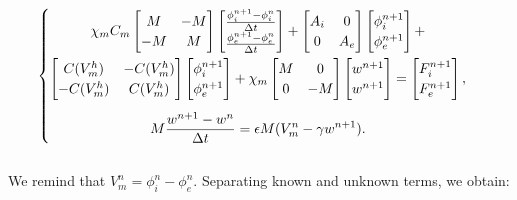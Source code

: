 \documentclass[a4paper,11pt]{article}
\begin{document}
\begin{equation*}
\begin{cases}
 \begin{gathered}
 \chi_mC_m \begin{bmatrix}M &-M \\ -M & M \end{bmatrix}
	\begin{bmatrix}\frac{\phi_i^{n+1}-\phi_i^{n}}{\Delta t} \\ \frac{\phi_e^{n+1}-\phi_e^{n}}{\Delta t}  \end{bmatrix}
	 + \begin{bmatrix}A_i & 0 \\ 0 & A_e \end{bmatrix}
	 \begin{bmatrix}\phi_i^{n+1} \\ \phi_e^{n+1} \end{bmatrix} +\\
	   \begin{bmatrix}C(V_m^h) & -C(V_m^h) \\ -C(V_m^h) & C(V_m^h) \end{bmatrix} 
	   \begin{bmatrix} \phi_i^{n+1} \\ \phi_e^{n+1}  \end{bmatrix} 
	   +\chi_m \begin{bmatrix}M & 0 \\ 0 & -M \end{bmatrix} 
	   	\begin{bmatrix}w^{n+1} \\ w^{n+1} \end{bmatrix} = 
	   	\begin{bmatrix} F_i^{n+1} \\ F_e^{n+1}\end{bmatrix},\vspace{2mm}\\
	   M \frac{w^{n+1}-w^n}{\Delta t}=\epsilon M (V_m^n-\gamma w^{n+1}).
\end{gathered}
\end{cases}
\end{equation*}\\
We remind that $V_m^n=\phi_i^n-\phi_e^n$. Separating known and unknown terms, we obtain: \vspace{3mm}
\end{document}
